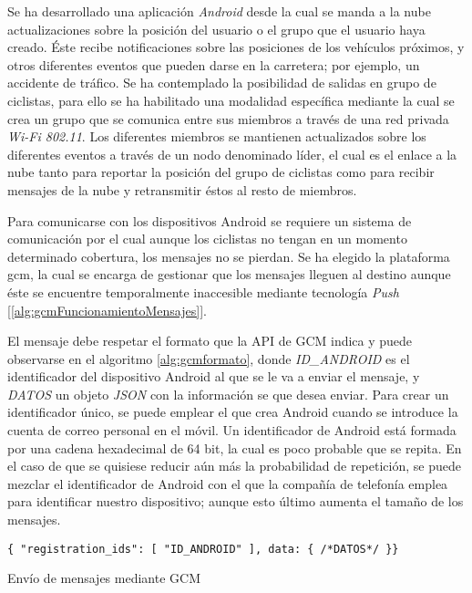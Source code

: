 Se ha desarrollado una aplicación \emph{Android} desde la cual se manda a la nube actualizaciones sobre la posición del usuario o el grupo que el usuario haya creado. \'Este recibe notificaciones sobre las posiciones de los vehículos próximos, y otros diferentes eventos que pueden darse en la carretera; por ejemplo, un accidente de tráfico. Se ha contemplado la posibilidad de salidas en grupo de ciclistas, para ello se ha habilitado una modalidad específica mediante la cual se crea un grupo que se comunica entre sus miembros a través de una red privada \emph{Wi-Fi 802.11}. Los diferentes miembros se mantienen actualizados sobre los diferentes eventos a través de un nodo denominado líder, el cual es el enlace a la nube tanto para reportar la posición del grupo de ciclistas como para recibir mensajes de la nube y retransmitir éstos al resto de miembros.

Para comunicarse con los dispositivos Android se requiere un sistema de comunicación por el cual aunque los ciclistas no tengan en un momento determinado cobertura, los mensajes no se pierdan. Se ha elegido la plataforma \gls{gcm}, la cual se encarga de gestionar que los mensajes lleguen al destino aunque éste se encuentre temporalmente inaccesible mediante tecnología \emph{Push} [\ref{alg:gcmFuncionamientoMensajes}]. 

El mensaje debe respetar el formato que la API de GCM indica y puede observarse en el algoritmo \ref{alg:gcmformato}, donde \emph{ID\_ANDROID} es el identificador del dispositivo Android al que se le va a enviar el mensaje, y \emph{DATOS} un objeto \emph{JSON} con la información se que desea enviar. Para crear un identificador único, se puede emplear el que crea Android cuando se introduce la cuenta de correo personal en el móvil. Un identificador de Android está formada por una cadena hexadecimal de 64 bit, la cual es poco probable que se repita. En el caso de que se quisiese reducir aún más la probabilidad de repetición, se puede mezclar el identificador de Android con el que la compañía de telefonía emplea para identificar nuestro dispositivo; aunque esto último aumenta el tamaño de los mensajes.

\begin{listing}
	\begin{minipage}{.4\textwidth}
		\begin{verbatim}
{ "registration_ids": [ "ID_ANDROID" ], data: { /*DATOS*/ }}
		\end{verbatim}
	\end{minipage}
	\caption{Envío de mensajes mediante GCM}\label{alg:gcmformato}
\end{listing}

